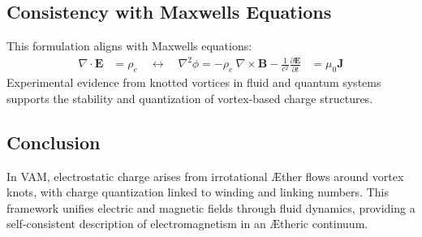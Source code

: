 \subsection{Consistency with Maxwell\rqs s Equations}


This formulation aligns with Maxwell\rqs s equations:
\begin{align}
    \nabla \cdot \mathbf{E} &= \rho_e \quad \leftrightarrow \quad \nabla^2 \phi = -\rho_e\
    \nabla \times \mathbf{B} - \frac{1}{c^2}\frac{\partial \mathbf{E}}{\partial t} &= \mu_0 \mathbf{J}
\end{align}
Experimental evidence from knotted vortices in fluid and quantum systems supports the stability and quantization of vortex-based charge structures.


\subsection{Conclusion}


In VAM, electrostatic charge arises from irrotational Æther flows around vortex knots, with charge quantization linked to winding and linking numbers. This framework unifies electric and magnetic fields through fluid dynamics, providing a self-consistent description of electromagnetism in an Ætheric continuum.